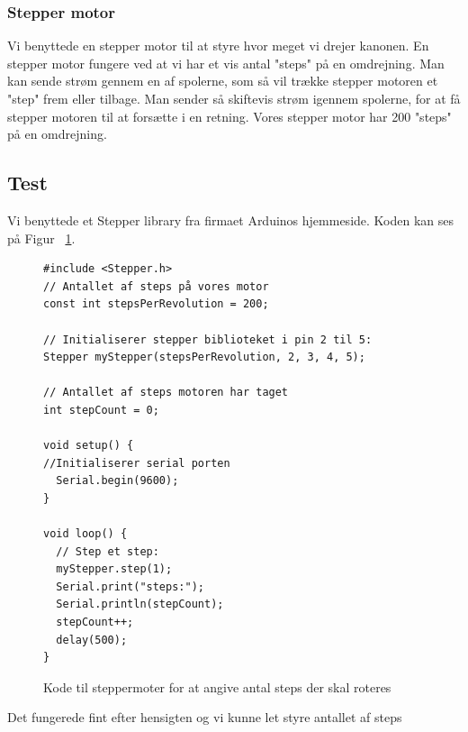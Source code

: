 \subsubsection{Stepper motor}
Vi benyttede en stepper motor til at styre hvor meget vi drejer kanonen. En stepper motor fungere ved at vi har et vis antal "steps" på en omdrejning. Man kan sende strøm gennem en af spolerne, som så vil trække stepper motoren et "step" frem eller tilbage. Man sender så skiftevis strøm igennem spolerne, for at få stepper motoren til at forsætte i en retning. Vores stepper motor har 200 "steps" på en omdrejning. 

\subsection{Test}
Vi benyttede et Stepper library fra firmaet Arduinos hjemmeside\cite{steppercode:stepbystep}. Koden kan ses på Figur ~\ref{fig:steptest}. 

\begin{figure}[H] 
\caption{Kode til steppermoter for at angive antal steps der skal roteres}
\label{fig:steptest}
\begin{lstlisting}
#include <Stepper.h>
// Antallet af steps på vores motor
const int stepsPerRevolution = 200;  

// Initialiserer stepper biblioteket i pin 2 til 5:
Stepper myStepper(stepsPerRevolution, 2, 3, 4, 5);

// Antallet af steps motoren har taget
int stepCount = 0;         

void setup() {
//Initialiserer serial porten
  Serial.begin(9600);
}

void loop() {
  // Step et step:
  myStepper.step(1);
  Serial.print("steps:");
  Serial.println(stepCount);
  stepCount++;
  delay(500);
}
\end{lstlisting}
\end{figure}

Det fungerede fint efter hensigten og vi kunne let styre antallet af steps

